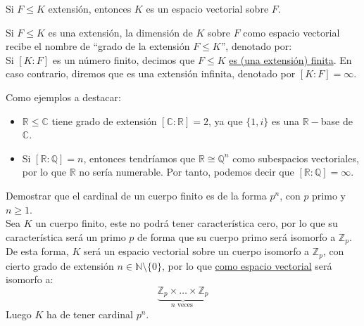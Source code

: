 \begin{observacion}
    Si $F\leq K$ extensión, entonces $K$ es un espacio vectorial sobre $F$.
\end{observacion}

\begin{definicion}
    Si $F\leq K$ es una extensión, la dimensión de $K$ sobre $F$ como espacio vectorial recibe el nombre de ``grado de la extensión $F\leq K$'', denotado por: 
    \begin{equation*}
        [K:F]
    \end{equation*}
    Si $[K:F]$ es un número finito, decimos que $F\leq K$ \underline{es (una extensión) finita}. En caso contrario, diremos que es una extensión infinita, denotado por $[K:F] = \infty$.
\end{definicion}

\begin{ejemplo}
    Como ejemplos a destacar:
    \begin{itemize}
        \item $\mathbb{R}\leq \mathbb{C}$ tiene grado de extensión $[\mathbb{C}:\mathbb{R}] = 2$, ya que $\{1,i\}$ es una $\mathbb{R}-$base de $\mathbb{C}$.
        \item Si $[\mathbb{R}:\mathbb{Q}] = n$, entonces tendríamos que $\mathbb{R}\cong \mathbb{Q}^n$ como subespacios vectoriales, por lo que $\mathbb{R}$ no sería numerable. Por tanto, podemos decir que $[\mathbb{R}:\mathbb{Q}]=\infty$.
    \end{itemize}
\end{ejemplo}

\begin{ejercicio}\label{ej:cardinal_cuerpo}
    Demostrar que el cardinal de un cuerpo finito es de la forma $p^n$, con $p$ primo y $n\geq 1$.\\

    \noindent
    Sea $K$ un cuerpo finito, este no podrá tener característica cero, por lo que su característica será un primo $p$ de forma que su cuerpo primo será isomorfo a $\mathbb{Z}_p$. De esta forma, $K$ será un espacio vectorial sobre un cuerpo isomorfo a $\mathbb{Z}_p$, con cierto grado de extensión $n\in \mathbb{N}\setminus \{0\}$, por lo que \underline{como espacio vectorial} será isomorfo a:
    \begin{equation*}
        \underbrace{\mathbb{Z}_p\times \ldots \times \mathbb{Z}_p}_{n\text{ veces }}
    \end{equation*}
    Luego $K$ ha de tener cardinal $p^n$.
\end{ejercicio}

